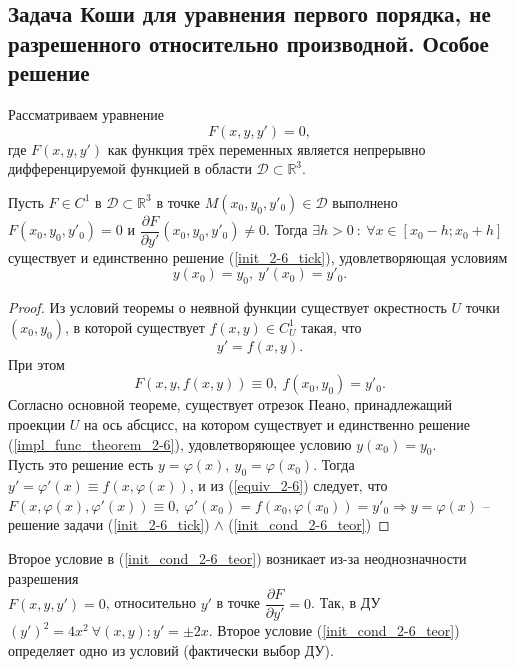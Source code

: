 \subsection{Задача Коши для уравнения первого порядка, не разрешенного относительно производной. Особое решение}
Рассматриваем уравнение
\begin{equation}\label{init_2-6_tick}
	F(x, y, y') = 0,
\end{equation}
где $F(x, y, y')$ как функция трёх переменных является непрерывно дифференцируемой функцией в области $\mathcal{D} \subset \mathbb{R}^3$.
\begin{theorem}
	Пусть $F \in C^1$ в $\mathcal{D} \subset \mathbb{R}^3$ в точке $M(x_0, y_0, y'_0) \in \mathcal{D}$ выполнено $F(x_0, y_0, y'_0) = 0$ и $\dfrac{\partial F}{\partial y'}(x_0, y_0, y'_0) \neq 0$. Тогда $\exists h > 0\ : \ \forall x \in [x_0 - h; x_0 + h]$ существует и единственно решение (\ref{init_2-6_tick}), удовлетворяющая условиям
\begin{equation}\label{init_cond_2-6_teor}
	y(x_0) = y_0,\ y'(x_0) = y'_0.
\end{equation}		
\end{theorem}
\begin{proof}
	Из условий теоремы о неявной функции существует окрестность $U$ точки $(x_0, y_0)$, в которой существует $f(x, y) \in C^1_U$ такая, что
	\begin{equation}\label{impl_func_theorem_2-6}
		y' = f(x, y).
	\end{equation}
	При этом
	\begin{equation} \label{equiv_2-6}
		F(x, y, f(x, y)) \equiv 0,\ f(x_0, y_0) = y'_0.
	\end{equation}
	Согласно основной теореме, существует отрезок Пеано, принадлежащий проекции $U$ на ось абсцисс, на котором существует и единственно решение (\ref{impl_func_theorem_2-6}), удовлетворяющее условию $y(x_0) = y_0$.\\
	Пусть это решение есть $y = \varphi(x),\ y_0 = \varphi(x_0)$. Тогда $y' = \varphi'(x) \equiv f (x, \varphi(x))$, и из (\ref{equiv_2-6}) следует, что $F(x, \varphi(x), \varphi'(x)) \equiv 0,\ \varphi'(x_0) = f(x_0, \varphi(x_0)) = y'_0 \Rightarrow y = \varphi(x)$ -- решение задачи (\ref{init_2-6_tick}) $\wedge$ (\ref{init_cond_2-6_teor})
\end{proof}
\begin{remark}
	Второе условие в (\ref{init_cond_2-6_teor}) возникает из-за неоднозначности разрешения \\ $F(x, y, y') = 0$, относительно $y'$ в точке $\dfrac{\partial F}{\partial y'} = 0$. Так, в ДУ $(y')^2 = 4x^2\ \forall(x, y) : y' = \pm2x$. Второе условие (\ref{init_cond_2-6_teor}) определяет одно из условий (фактически выбор ДУ).
\end{remark} 
